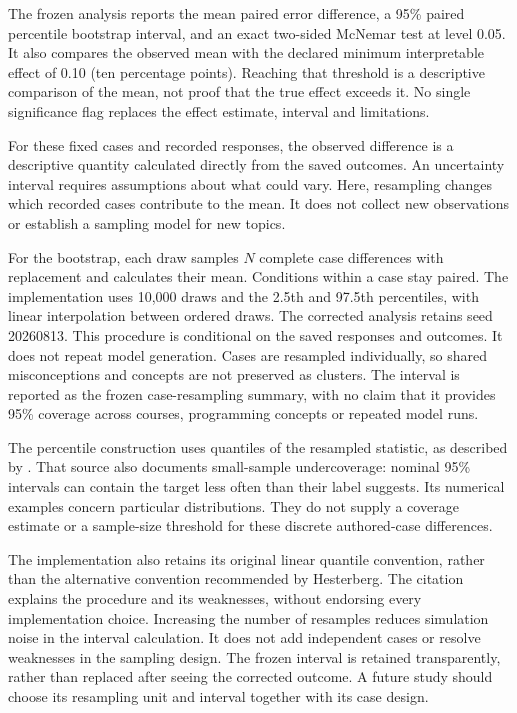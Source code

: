 The frozen analysis reports the mean paired error difference, a 95\% paired percentile bootstrap interval, and an exact
two-sided McNemar test at level 0.05. It also compares the observed mean with the declared minimum interpretable effect of
0.10 (ten percentage points). Reaching that threshold is a descriptive comparison of the mean, not proof that the true effect
exceeds it. No single significance flag replaces the effect estimate, interval and limitations.

For these fixed cases and recorded responses, the observed difference is a descriptive quantity calculated directly from
the saved outcomes. An uncertainty interval requires assumptions about what could vary. Here, resampling changes which
recorded cases contribute to the mean. It does not collect new observations or establish a sampling model for new topics.

For the bootstrap, each draw samples $N$ complete case differences with replacement and calculates their mean. Conditions
within a case stay paired. The implementation uses 10,000 draws and the 2.5th and 97.5th percentiles, with linear interpolation
between ordered draws. The corrected analysis retains seed 20260813. This procedure is conditional on the saved responses and
outcomes. It does not repeat model generation. Cases are resampled individually, so shared misconceptions and concepts are
not preserved as clusters. The interval is reported as the frozen case-resampling summary, with no claim that it provides
95\% coverage across courses, programming concepts or repeated model runs.

The percentile construction uses quantiles of the resampled statistic, as described by
\textcite{hesterberg2015bootstrap}. That source also documents small-sample undercoverage:
nominal 95\% intervals can contain the target less often than their label suggests. Its numerical examples concern particular
distributions. They do not supply a coverage estimate or a sample-size threshold for these discrete authored-case differences.

The implementation also retains its original linear quantile convention, rather than the alternative convention recommended
by Hesterberg. The citation explains the procedure and its weaknesses, without endorsing every implementation
choice. Increasing the number of resamples reduces simulation noise in the interval calculation. It does not add independent
cases or resolve weaknesses in the sampling design. The frozen interval is retained transparently, rather than replaced after
seeing the corrected outcome. A future study should choose its resampling unit and interval together with its case design.

